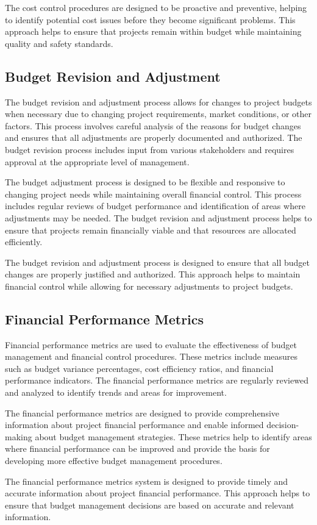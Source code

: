 The cost control procedures are designed to be proactive and preventive, helping to identify potential cost issues before they become significant problems. This approach helps to ensure that projects remain within budget while maintaining quality and safety standards.

\subsection{Budget Revision and Adjustment}
The budget revision and adjustment process allows for changes to project budgets when necessary due to changing project requirements, market conditions, or other factors. This process involves careful analysis of the reasons for budget changes and ensures that all adjustments are properly documented and authorized. The budget revision process includes input from various stakeholders and requires approval at the appropriate level of management.

The budget adjustment process is designed to be flexible and responsive to changing project needs while maintaining overall financial control. This process includes regular reviews of budget performance and identification of areas where adjustments may be needed. The budget revision and adjustment process helps to ensure that projects remain financially viable and that resources are allocated efficiently.

The budget revision and adjustment process is designed to ensure that all budget changes are properly justified and authorized. This approach helps to maintain financial control while allowing for necessary adjustments to project budgets.

\subsection{Financial Performance Metrics}
Financial performance metrics are used to evaluate the effectiveness of budget management and financial control procedures. These metrics include measures such as budget variance percentages, cost efficiency ratios, and financial performance indicators. The financial performance metrics are regularly reviewed and analyzed to identify trends and areas for improvement.

The financial performance metrics are designed to provide comprehensive information about project financial performance and enable informed decision-making about budget management strategies. These metrics help to identify areas where financial performance can be improved and provide the basis for developing more effective budget management procedures.

The financial performance metrics system is designed to provide timely and accurate information about project financial performance. This approach helps to ensure that budget management decisions are based on accurate and relevant information.
